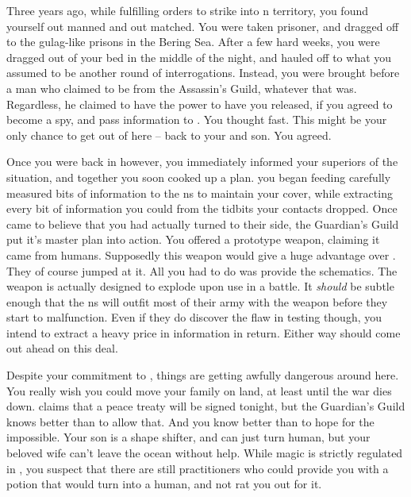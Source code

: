 \documentclass[char]{NeptuneBall}
\begin{document}
Three years ago, while fulfilling orders to strike into \pPacifica{}n territory, you found yourself out manned and out matched. You were taken prisoner, and dragged off to the gulag-like prisons in the Bering Sea. After a few hard weeks, you were dragged out of your bed in the middle of the night, and hauled off to what you assumed to be another round of interrogations. Instead, you were brought before a man who claimed to be from the Assassin's Guild, whatever that was. Regardless, he claimed to have the power to have you released, if you agreed to become a spy, and pass information to \pPacifica{}. You thought fast. This might be your only chance to get out of here -- back to your \cQueen{\spouse} and son. You agreed.

Once you were back in \pAtlantis{} however, you immediately informed your superiors of the situation, and together you soon cooked up a plan. you began feeding carefully measured bits of information to the \pPacifica{}ns to maintain your cover, while extracting every bit of information you could from the tidbits your contacts dropped. Once \pPacifica{} came to believe that you had actually turned to their side, the Guardian's Guild put it's master plan into action. You offered \pPacifica{} a prototype weapon, claiming it came from humans. Supposedly this weapon would give \pPacifica{} a huge advantage over \pAtlantis{}. They of course jumped at it.  All you had to do was provide the schematics. The weapon is actually designed to explode upon use in a battle. It \emph{should} be subtle enough that the \pPacifica{}ns will outfit most of their army with the weapon before they start to malfunction. Even if they do discover the flaw in testing though, you intend to extract a heavy price in information in return. Either way \pAtlantis{} should come out ahead on this deal.

Despite your commitment to \pAtlantis{}, things are getting awfully dangerous around here. You really wish you could move your family on land, at least until the war dies down. \cKing{\King} \cKing{} claims that a peace treaty will be signed tonight, but the Guardian's Guild knows better than to allow that. And you know better than to hope for the impossible. Your son is a shape shifter, and can just turn human, but your beloved wife \cQueen{} can't leave the ocean without help. While magic is strictly regulated in \pAtlantis{}, you suspect that there are still practitioners who could provide you with a potion that would turn \cQueen{} into a human, and not rat you out for it.
\end{document}
